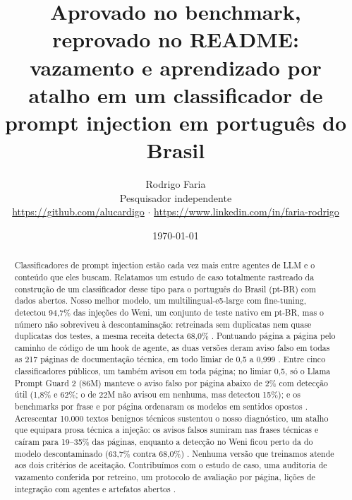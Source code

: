 \documentclass[11pt]{article}
\begin{document}
\title{Aprovado no benchmark, reprovado no README: vazamento e aprendizado por atalho em um classificador de prompt injection em português do Brasil}
\author{Rodrigo Faria\\ \normalsize Pesquisador independente\\ \normalsize \url{https://github.com/alucardigo} \ensuremath{\cdot} \url{https://www.linkedin.com/in/faria-rodrigo}}
\date{\today}
\maketitle

\begin{abstract}
Classificadores de prompt injection estão cada vez mais entre agentes de LLM e o conteúdo que eles buscam. Relatamos um estudo de caso totalmente rastreado da construção de um classificador desse tipo para o português do Brasil (pt-BR) com dados abertos. Nosso melhor modelo, um multilingual-e5-large com fine-tuning, detectou 94,7\% %
das injeções do Weni, um conjunto de teste nativo em pt-BR, mas o número não sobreviveu à descontaminação: retreinada sem duplicatas nem quase duplicatas dos testes, a mesma receita detecta 68,0\%%
. Pontuando página a página pelo caminho de código de um hook de agente, as duas versões deram aviso falso em todas as 217 %
páginas de documentação técnica, em todo limiar de 0,5 a 0,999%
. Entre cinco classificadores públicos, um também avisou em toda página; no limiar 0,5, só o Llama Prompt Guard 2 (86M) manteve o aviso falso por página abaixo de 2\% com detecção útil (1,8\% e 62\%; o de 22M não avisou em nenhuma, mas detectou 15\%); e os benchmarks por frase e por página ordenaram os modelos em sentidos opostos%
. Acrescentar 10.000 textos benignos técnicos sustentou o nosso diagnóstico, um atalho que equipara prosa técnica a injeção: os avisos falsos sumiram nas frases técnicas e caíram para 19–35\% das páginas, enquanto a detecção no Weni ficou perto da do modelo descontaminado (63,7\% contra 68,0\%)%
. Nenhuma versão que treinamos atende aos dois critérios de aceitação. Contribuímos com o estudo de caso, uma auditoria de vazamento conferida por retreino, um protocolo de avaliação por página, lições de integração com agentes e artefatos abertos%
.

\end{abstract}
\end{document}
